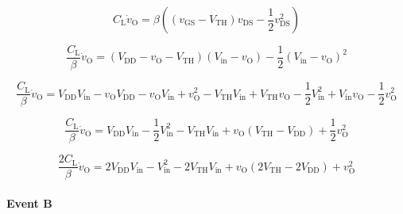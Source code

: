 \documentclass{article}[11pt]
\begin{document}
\begin{equation}
C_{\mathrm{L}} \dot{v}_{\mathrm{O}} = 
\beta \left(\left(v_{\mathrm{GS}}-V_{\mathrm{TH}}\right)v_{\mathrm{DS}}-\frac{1}{2}v_{\mathrm{DS}}^2\right)
\end{equation}

\begin{equation}
\frac{C_{\mathrm{L}}}{\beta} \dot{v}_{\mathrm{O}} = 
\left(V_{\mathrm{DD}}-v_{\mathrm{O}}-V_{\mathrm{TH}}\right)\left(V_{\mathrm{in}}-v_{\mathrm{O}}\right)-\frac{1}{2}\left(V_{\mathrm{in}}-v_{\mathrm{O}}\right)^2
\end{equation}

\begin{equation}
\frac{C_{\mathrm{L}}}{\beta} \dot{v}_{\mathrm{O}} = 
V_{\mathrm{DD}} V_{\mathrm{in}} - v_{\mathrm{O}} V_{\mathrm{DD}} -v_{\mathrm{O}} V_{\mathrm{in}} +v_{\mathrm{O}}^2-V_{\mathrm{TH}}V_{\mathrm{in}}+V_{\mathrm{TH}}v_{\mathrm{O}}
  -\frac{1}{2} V_{\mathrm{in}}^2 + V_{\mathrm{in}} v_{\mathrm{O}}  - \frac{1}{2} v_{\mathrm{O}}^2
\end{equation}

\begin{equation}
\frac{C_{\mathrm{L}}}{\beta} \dot{v}_{\mathrm{O}} = 
V_{\mathrm{DD}} V_{\mathrm{in}} -\frac{1}{2} V_{\mathrm{in}}^2 -V_{\mathrm{TH}}V_{\mathrm{in}}
+ v_{\mathrm{O}} \left(V_{\mathrm{TH}}-V_{\mathrm{DD}}\right) + \frac{1}{2} v_{\mathrm{O}}^2
\end{equation}

\begin{equation}
\frac{2C_{\mathrm{L}}}{\beta} \dot{v}_{\mathrm{O}} = 
2 V_{\mathrm{DD}} V_{\mathrm{in}} - V_{\mathrm{in}}^2 - 2 V_{\mathrm{TH}}V_{\mathrm{in}}
+ v_{\mathrm{O}} \left(2V_{\mathrm{TH}}-2V_{\mathrm{DD}}\right) + v_{\mathrm{O}}^2
\end{equation}

\paragraph{Event B}
\end{document}
